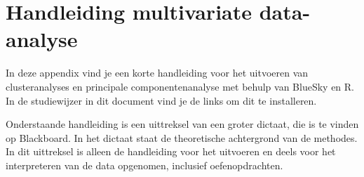 \chapter{Handleiding multivariate data-analyse}
\label{app:multivariaat}

In deze appendix vind je een korte handleiding voor het uitvoeren van clusteranalyses en principale componentenanalyse met behulp van BlueSky en R. In de studiewijzer in dit document vind je de links om dit te installeren.

Onderstaande handleiding is een uittreksel van een groter dictaat, die is te vinden op Blackboard. In het dictaat staat de theoretische achtergrond van de methodes. In dit uittreksel is alleen de handleiding voor het uitvoeren en deels voor het interpreteren van de data opgenomen, inclusief oefenopdrachten.

